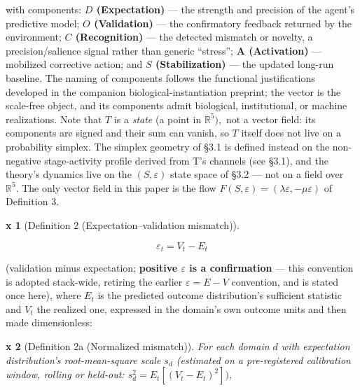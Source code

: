 \documentclass[11pt,twocolumn]{article}
\theoremstyle{gttdef}
\newtheorem*{gttdef}{x}
\theoremstyle{gttplain}
\begin{document}
with components: \textbf{$D$ (Expectation)} --- the strength and precision of the agent's predictive model; \textbf{$O$ (Validation)} --- the confirmatory feedback returned by the environment; \textbf{$C$ (Recognition)} --- the detected mismatch or novelty, a precision/salience signal rather than generic ``stress''; \textbf{A (Activation)} --- mobilized corrective action; and \textbf{$S$ (Stabilization)} --- the updated long-run baseline. The naming of components follows the functional justifications developed in the companion biological-instantiation preprint; the vector is the scale-free object, and its components admit biological, institutional, or machine realizations. Note that $T$ is a \emph{state} (a point in $\mathbb{R}^{5}),$ not a vector field: its components are signed and their sum can vanish, so $T$ itself does not live on a probability simplex. The simplex geometry of \S{}3.1 is defined instead on the non-negative stage-activity profile derived from T's channels (see \S{}3.1), and the theory's dynamics live on the $(S, \varepsilon)$ state space of \S{}3.2 --- not on a field over $\mathbb{R}^{5}.$ The only vector field in this paper is the flow $F(S, \varepsilon) = (\lambda\varepsilon, -\mu\varepsilon)$ of Definition 3.

\begin{gttdef}[{Definition 2 (Expectation–validation mismatch)}]

\end{gttdef}

\begin{equation}
\varepsilon_t = V_t - E_t
\label{eq:mismatch}
\end{equation}

(validation minus expectation; \textbf{positive $\varepsilon$ is a confirmation} --- this convention is adopted stack-wide, retiring the earlier $\varepsilon = E - V$ convention, and is stated once here), where $E_t$ is the predicted outcome distribution's sufficient statistic and $V_t$ the realized one, expressed in the domain's own outcome units and then made dimensionless:

\begin{gttdef}[{Definition 2a (Normalized mismatch)}]

For each domain $d$ with expectation distribution's root-mean-square scale $s_d$ (estimated on a pre-registered calibration window, rolling or held-out: $s_d^{2} = E_t[(V_t - E_t)^{2}]),$

\end{gttdef}
\end{document}
